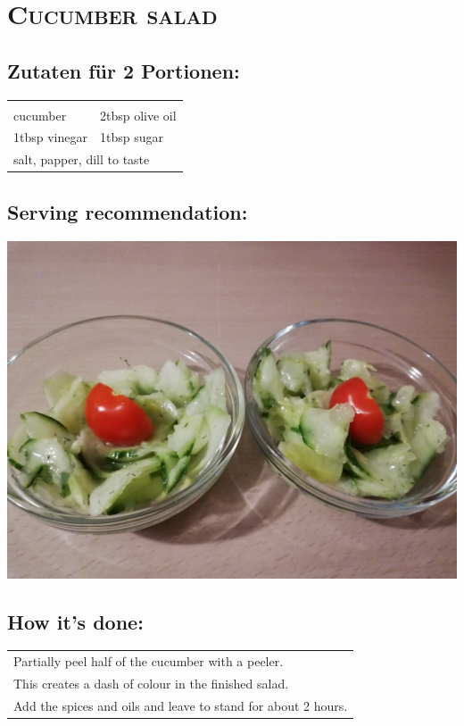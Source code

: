 \section{\textsc{Cucumber salad}}

\subsection*{Zutaten für 2 Portionen:}

\begin{tabular}{p{7.5cm} p{7.5cm}}
	& \\
	\sfrac{1}{2} cucumber & 2tbsp olive oil \\
	1tbsp vinegar & 1tbsp sugar \\
	\multicolumn{2}{l}{salt, papper, dill to taste}
\end{tabular}

\subsection*{Serving recommendation:}

\includegraphics[width=\textwidth]{img/gurkensalat/gurkensalat_fertig.jpg} \cite{gurkensalat}

\subsection*{How it's done:}

\begin{tabular}{p{15cm}}
	\\
  Partially peel half of the cucumber with a peeler.\\
  This creates a dash of colour in the finished salad.\\
  Add the spices and oils and leave to stand for about 2 hours.
\end{tabular}

